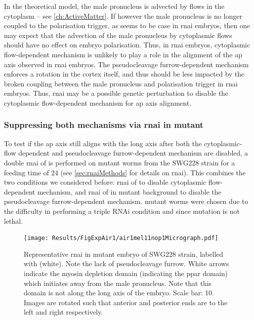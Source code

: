 In the theoretical model, the male pronucleus is advected by flows in the cytoplasm -- see \autoref{ch:ActiveMatter}. If however the male pronucleus is no longer coupled to the polarisation trigger, as seems to be case in  \ac{rnai} embryos, then one may expect that the advection of the male pronucleus by cytoplasmic flows should have no effect on embryo polarisation. Thus, in  \ac{rnai} embryos, cytoplasmic flow-dependent mechanism is unlikely to play a role in the alignment of the \ac{ap} axis observed in  \ac{rnai} embryos. The pseudocleavage furrow-dependent mechanism enforces a rotation in the cortex itself, and thus should be less impacted by the broken coupling between the male pronucleus and polarisation trigger in  \ac{rnai} embryos. Thus,  \ac{rnai} may be a possible genetic perturbation to disable the cytoplasmic flow-dependent mechanism for \ac{ap} axis alignment.

\subsubsection{Suppressing both mechanisms via  \ac{rnai} in  mutant}
To test if the \ac{ap} axis still aligns with the long axis after both the cytoplasmic-flow dependent and pseudocleavage furrow-dependent mechanism are disabled, a double \ac{rnai} of  is performed on  mutant worms from the SWG228 strain for a feeding time of \SI{24}{\unitRNAiTime} (see \autoref{sec:rnaiMethods} for details on \ac{rnai}). This combines the two conditions we considered before: \ac{rnai} of  to disable cytoplasmic flow-dependent mechanism, and \ac{rnai} of  in  mutant background to disable the pseudocleavage furrow-dependent mechanism.  mutant worms were chosen due to the difficulty in performing a triple RNAi condition and since  mutation is not lethal.

\begin{figure}
\centering
\texttt{[image: Results/FigExpAir1/air1mel11nop1Micrograph.pdf]}
\caption[Representative micrograph:  \acs{rnai} in  mutant embryos]{Representative  \ac{rnai} in  mutant embryo of SWG228 strain, labelled with  (white). Note the lack of pseudocleavage furrow. White arrows indicate the myosin depletion domain (indicating the \ac{ppar} domain) which initiates away from the male pronucleus. Note that this domain is not along the long axis of the embryo. Scale bar: \SI{10}{\unitLength}. Images are rotated such that anterior and posterior ends are to the left and right respectively.}
\label{fig:swg228Air1Nop1Mel11Micrograph}
\end{figure}

